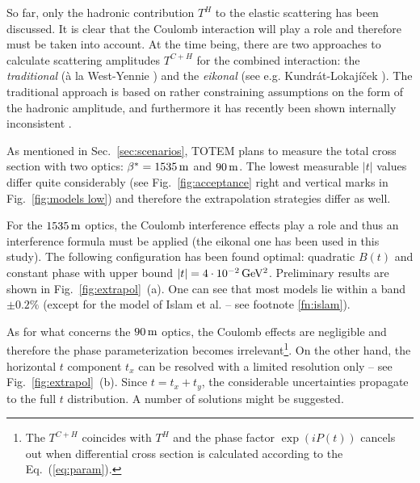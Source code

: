 \documentclass{cimento}
\def\be{\beta}
\def\un#1{\,{\rm #1}}
\begin{document}
So far, only the hadronic contribution $T^H$ to the elastic scattering has been discussed. It is clear that the Coulomb interaction will play a role and therefore must be taken into account. At the time being, there are two approaches to calculate scattering amplitudes $T^{C+H}$ for the combined interaction: the {\em traditional} (\`a la West-Yennie \cite{wy}) and the {\em eikonal} (see e.g. Kundr\' at-Lokaj\' i\v cek \cite{kl}). The traditional approach is based on rather constraining assumptions on the form of the hadronic amplitude, and furthermore it has recently been shown internally inconsistent \cite{wy inconsistent}.



\iffalse
\begin{figure}[htb]
\centerline{\hss
	\texttt{[image: ../fig/coulombInterference\_lin\_bw]}\hfil
	\texttt{[image: ../fig/R\_bw]}\hss
}%
\caption{Left: An illustration of Coulomb-hadron interference effects. Right: A comparison of West-Yennie and eikonal interference formulae (for $E=14\un{TeV}$). Acceptance starting points are also marked.}%
\label{fig:coulomb}%
\end{figure}
\fi

As mentioned in Sec.~\ref{sec:scenarios}, TOTEM plans to measure the total cross section with two optics: $\be^* = 1535\un{m}$ and $90\un{m}$. The lowest measurable $|t|$ values differ quite considerably (see Fig.~\ref{fig:acceptance} right and vertical marks in Fig.~\ref{fig:models low}) and therefore the extrapolation strategies differ as well.

For the $1535\un{m}$ optics, the Coulomb interference effects play a role and thus an interference formula must be applied (the eikonal one has been used in this study). The following configuration has been found optimal: quadratic $B(t)$ and constant phase with upper bound $|t| = 4\cdot10^{-2}\un{GeV^2}$. Preliminary results are shown in Fig.~\ref{fig:extrapol}~(a). One can see that most models lie within a band $\pm 0.2\%$ (except for the model of Islam et al. -- see footnote \ref{fn:islam}).

As for what concerns the $90\un{m}$ optics, the Coulomb effects are negligible and therefore the phase parameterization becomes irrelevant\footnote{%
The $T^{C+H}$ coincides with $T^H$ and the phase factor $\exp{(i P(t))}$ cancels out when differential cross section is calculated according to the Eq.~(\ref{eq:param}).
}. On the other hand, the horizontal $t$ component $t_x$  can be resolved with a limited resolution only -- see Fig.~\ref{fig:extrapol}~(b). Since $t = t_x + t_y$, the considerable uncertainties propagate to the full $t$ distribution. A number of solutions might be suggested.
\end{document}
